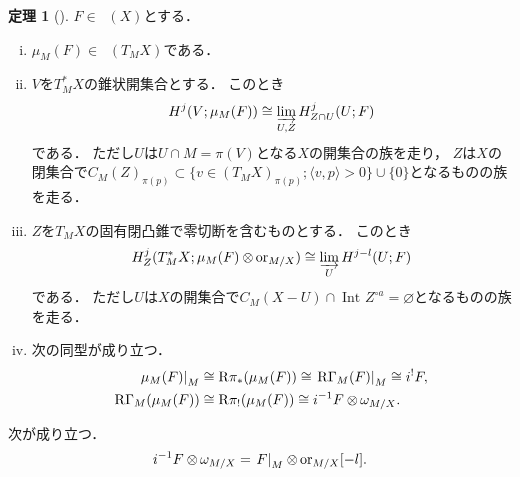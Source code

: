 \documentclass[uplatex,dvipdfmx,a4paper,10pt,draft]{jsarticle}
\theoremstyle{definition}
\newcommand{\rr}{\mathbf{R}}
\numberwithin{equation}{section}
\newcommand{\Dompb}{\mathop{\mathsf{D}^\mathrm{b}}\nolimits}
\newcommand{\RG}{\mathop{\mathrm{R}\hspace{-0pt}\Gamma}\nolimits}
\newcommand{\Rder}{\mathrm{R}}
\newcommand{\indlim}[1][]{\mathop{\varinjlim}\limits_{#1}}
\newcommand{\ori}{\mathord{\mathrm{or}}}
\newcommand{\tens}[1][]{\mathbin{\otimes_{\raise1.5ex\hbox to-.1em{}{#1}}}}
\newcommand{\mres}[2][]{{\left.{#1}\right\rvert}_{#2}}
\theoremstyle{mystyle}
\newtheorem{mythm}{定理}[section]
\newenvironment{thm}{\begin{thmbox}\begin{mythm}}{\end{mythm}\end{thmbox}}
\newcommand{\Dbcon}{\mathop{\mathsf{D}^{\mathrm{b}}_{\rr^+}}\nolimits}
\newcommand{\Int}[1][]{\mathop{\mathrm{Int}}\nolimits_{#1}}
\def\inner<#1>{\langle #1 \rangle}
\begin{document}
\begin{thm}[{\cite[Thm 4.3.2]{KS90}}]
    \(F\in\Dompb(X)\)とする．
    \begin{enumerate}[(i)]
        \item \(\mu_{M}(F)\in\Dbcon(T_{M}X)\)である．
        \item \(V\)を\(T^{\ast}_{M}X\)の錐状開集合とする．
        このとき\[
            H^{j}(V;\mu_{M}(F))
            \cong
            \indlim[U,Z]H_{Z\cap U}^{j}(U;F)
        \]である．
        ただし\(U\)は\(
            U\cap M=\pi(V)
        \)となる\(X\)の開集合の族を走り，
        \(Z\)は\(X\)の閉集合で\(
            C_{M}(Z)_{\pi(p)}
            \subset 
            \{v\in (T_{M}X)_{\pi(p)};\inner<v,p>>0\}\cup\{0\}
        \)となるものの族を走る．
        \item \(Z\)を\(T_{M}X\)の固有閉凸錐で零切断を含むものとする．
        このとき\[
            H^{j}_{Z}(T^{\ast}_{M}X;\mu_{M}(F)\tens[]\ori_{M/X})
            \cong
            \indlim[U]H^{j-l}(U;F)
        \]である．
        ただし\(U\)は\(X\)の開集合で\(
            C_{M}(X-U)\cap\Int[]{Z^{\circ a}}=\varnothing
        \)となるものの族を走る．
        \item 次の同型が成り立つ．\begin{align*}
            \mres[\mu_{M}(F)]{M}
            &\cong \Rder{\pi}_{\ast}(\mu_{M}(F))
            \cong \mres[\RG_{M}(F)]{M}
            \cong i^{!}F,\\
            \RG_{M}(\mu_{M}(F))
            &\cong \Rder{\pi}_{!}(\mu_{M}(F))
            \cong i^{-1}F\tens[]\omega_{M/X}.
        \end{align*}
    \end{enumerate}
\end{thm}

次が成り立つ．
\[
    i^{-1}F\tens[]\omega_{M/X}
    =\mres[F]{M}\tens[]\ori_{M/X}[-l].
\]
\end{document}

